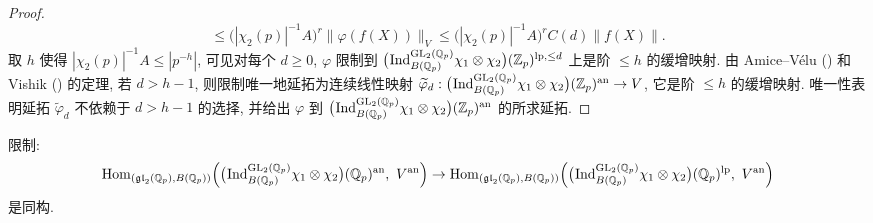 \begin{proof}
\[\le \bigl(|\chi_2(p)|^{-1}A\bigr)^{r}\|\varphi(f(X))\|_V
\le \bigl(|\chi_2(p)|^{-1}A\bigr)^{r}C(d)\|f(X)\|.
\]
取 $h$ 使得 $|\chi_2(p)|^{-1}A \le |p^{-h}|$, 可见对每个 $d \ge 0$, $\varphi$ 限制到 $\bigl(\prescript{}{}{\mathrm{Ind}}_{B(\mathbb{Q}_p)}^{\mathrm{GL}_2(\mathbb{Q}_p)} \chi_1 \otimes \chi_2\bigr)(\mathbb{Z}_p)^{\mathrm{lp},\le d}$ 上是阶 $\le h$ 的缓增映射.
由 Amice--V\'elu (\cite{ref:1}) 和 Vishik (\cite{ref:47}) 的定理, 若 $d > h-1$, 则限制唯一地延拓为连续线性映射 $\widetilde{\varphi}_d : \bigl(\prescript{}{}{\mathrm{Ind}}_{B(\mathbb{Q}_p)}^{\mathrm{GL}_2(\mathbb{Q}_p)} \chi_1 \otimes \chi_2\bigr)(\mathbb{Z}_p)^{\mathrm{an}} \to V$, 它是阶 $\le h$ 的缓增映射.
唯一性表明延拓 $\widetilde{\varphi}_d$ 不依赖于 $d > h-1$ 的选择, 并给出 $\varphi$ 到 $\bigl(\prescript{}{}{\mathrm{Ind}}_{B(\mathbb{Q}_p)}^{\mathrm{GL}_2(\mathbb{Q}_p)} \chi_1 \otimes \chi_2\bigr)(\mathbb{Z}_p)^{\mathrm{an}}$ 的所求延拓.
\end{proof}

\begin{lemma}\label{lem:A.2.2}
限制:
\[
\Hom_{(\mathfrak{gl}_2(\Qp),B(\Qp))}\Bigl(\bigl(\pind{}_{B(\Qp)}^{\GL_2(\Qp)} \chi_1 \otimes \chi_2\bigr)(\Qp)^{\mathrm{an}},\ V^{\mathrm{an}}\Bigr)
\to \Hom_{(\mathfrak{gl}_2(\Qp),B(\Qp))}\Bigl(\bigl(\pind{}_{B(\Qp)}^{\GL_2(\Qp)} \chi_1 \otimes \chi_2\bigr)(\Qp)^{\mathrm{lp}},\ V^{\mathrm{an}}\Bigr)
\]
是同构.
\end{lemma}

